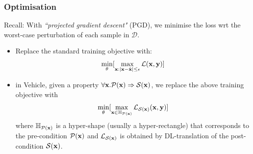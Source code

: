 \documentclass[t,compress,aspectratio=169]{beamer}
\newcommand{\distance}[2]{|#1 - #2|}
\newcommand{\xs}{\x} 			%
\begin{document}
\begin{frame}[fragile]
\frametitle{Optimisation}
 \vspace{-2em}

\begin{block}{Recall: With \emph{``projected gradient descent"} (PGD),}
 we minimise the loss wrt the worst-case perturbation of each sample in $\mathcal{D}$.
\begin{itemize}
     \item Replace the standard training objective with:
$$\min_{\theta} [\max_{\xs : \distance{\xs}{\xt} \leq \epsilon} \lossfn(\xs, \y)]$$
\end{itemize}
\end{block}
\pause
\begin{itemize}
     \item in Vehicle, given a property $\forall \xs. \mathcal{P}(\xs) \Rightarrow \mathcal{S}(\xs)$, we replace the above training objective with
$$\min_{\theta} [ \max_{\xs \in \mathbb{H}_{\mathcal{P}(\xs)}} \lossfn_{\mathcal{S}(\xs)}(\xs, \y)]$$
where $ \mathbb{H}_{\mathcal{P}(\xs)}$ is a hyper-shape (usually a hyper-rectangle)
that corresponds to the pre-condition $\mathcal{P}(\xs)$  and $\lossfn_{\mathcal{S}(\xs)}$ is obtained by DL-translation of the post-condition $\mathcal{S}(\xs)$.

\end{itemize}

\end{frame}
\end{document}
